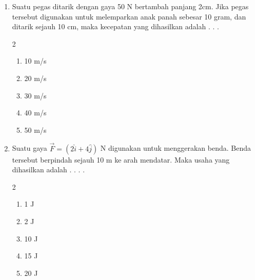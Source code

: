 \documentclass[14pt,a4paper]{extarticle}
\newcommand{\pilgani}[1]{                            \vspace{-0.3cm}\begin{multicols}{2}
 \begin{enumerate}[label=\Alph*., itemsep=0pt,topsep=0pt,leftmargin=*,align=Center]#1                     \end{enumerate}
 \phantom{ini cuma sapi, wedus, dan ayam}
 \end{multicols}}
\begin{document}
\begin{enumerate}
         
\item Suatu pegas ditarik dengan gaya 50 N bertambah panjang 2cm. Jika pegas tersebut digunakan untuk melemparkan anak panah sebesar 10 gram, dan ditarik sejauh 10 cm, maka kecepatan yang dihasilkan adalah . . . 
    \pilgani{
        \item 10 m/s
        \item 20 m/s
        \item 30 m/s
        \item 40 m/s
        \item 50 m/s
    }

\item Suatu gaya $\vec{F}=(2\hat{i}+4\hat{j})$ N digunakan untuk menggerakan benda. Benda tersebut berpindah sejauh 10 m ke arah mendatar. Maka usaha yang dihasilkan adalah . . . .
    \pilgani{
        \item 1 J
        \item 2 J
        \item 10 J
        \item 15 J
        \item 20 J 
    }







\end{enumerate}
\end{document}
